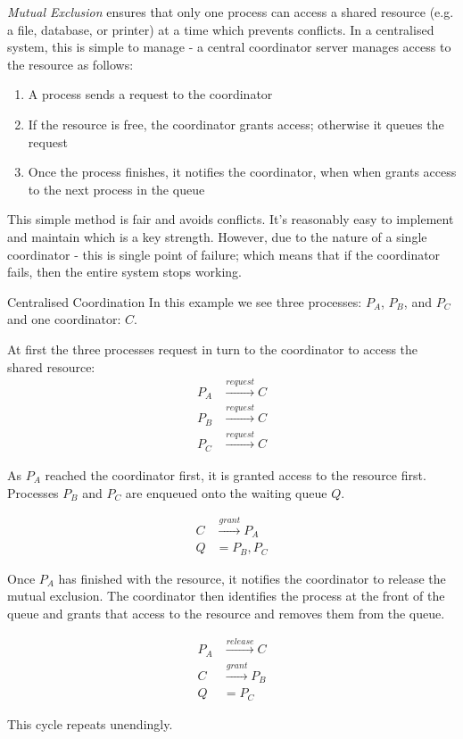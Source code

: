 
\textit{Mutual Exclusion} ensures that only one process can access a shared resource (e.g. a file, database, or printer) at a time which prevents conflicts. In a centralised system, this is simple to manage - a central coordinator server manages access to the resource as follows:
\begin{enumerate}
    \item A process sends a request to the coordinator
    \item If the resource is free, the coordinator grants access; otherwise it queues the request
    \item Once the process finishes, it notifies the coordinator, when when grants access to the next process in the queue
\end{enumerate}

This simple method is fair and avoids conflicts. It's reasonably easy to implement and maintain which is a key strength. However, due to the nature of a single coordinator - this is single point of failure; which means that if the coordinator fails, then the entire system stops working.

\begin{example}{Centralised Coordination}
In this example we see three processes: $P_A$, $P_B$, and $P_C$ and one coordinator: $C$.

At first the three processes request in turn to the coordinator to access the shared resource:
\begin{align*}
    P_A & \xrightarrow{request} C\\
    P_B & \xrightarrow{request} C\\
    P_C & \xrightarrow{request} C
\end{align*}

As $P_A$ reached the coordinator first, it is granted access to the resource first. Processes $P_B$ and $P_C$ are enqueued onto the waiting queue $Q$.

\begin{align*}
    C & \xrightarrow{grant} P_A\\
    Q &= P_B, P_C
\end{align*}

Once $P_A$ has finished with the resource, it notifies the coordinator to release the mutual exclusion. The coordinator then identifies the process at the front of the queue and grants that access to the resource and removes them from the queue.

\begin{align*}
    P_A & \xrightarrow{release} C\\
    C & \xrightarrow{grant} P_B\\
    Q &= P_C
\end{align*}

This cycle repeats unendingly.
\end{example}

